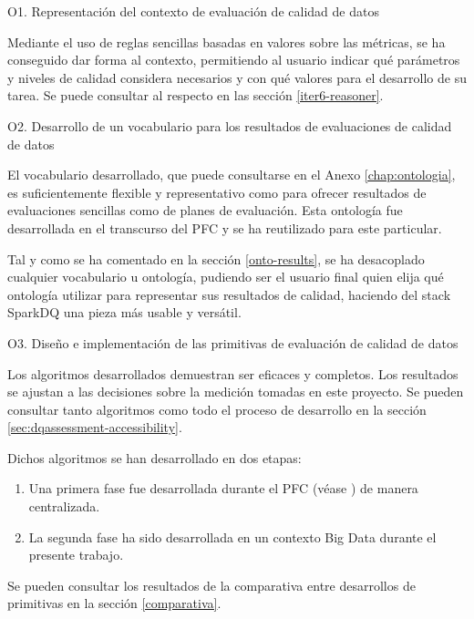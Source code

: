 \begin{definitionlist}
\item[O1. Representación del contexto de evaluación de calidad de datos]

Mediante el uso de reglas sencillas basadas en valores sobre las métricas,
se ha conseguido dar forma al contexto, permitiendo al
usuario indicar qué parámetros y niveles de calidad considera necesarios 
y con qué valores para el desarrollo de su tarea. Se
puede consultar al respecto en las sección \ref{iter6-reasoner}.


\item[O2. Desarrollo de un vocabulario para los resultados de evaluaciones de
  calidad de datos]

El vocabulario desarrollado, que puede consultarse en el Anexo
\ref{chap:ontologia}, es suficientemente flexible y representativo como para
ofrecer resultados de evaluaciones sencillas como de planes de evaluación. Esta
ontología fue desarrollada en el transcurso del \acs{PFC} y se ha reutilizado
para este particular. 

Tal y como se ha comentado en la sección \ref{onto-results}, se ha desacoplado
cualquier vocabulario u ontología, pudiendo ser el usuario final quien elija qué
ontología utilizar para representar sus resultados de calidad, haciendo del
stack SparkDQ una pieza más usable y versátil. 

\item[O3. Diseño e implementación de las primitivas de evaluación de calidad de
  datos]

Los algoritmos desarrollados demuestran ser eficaces y completos. Los resultados
se ajustan a las decisiones sobre la medición tomadas en este proyecto. Se
pueden consultar tanto algoritmos como todo el proceso de desarrollo en la
sección \ref{sec:dqassessment-accessibility}. 

Dichos algoritmos se han desarrollado en dos etapas:

\begin{enumerate}
\item Una primera fase fue desarrollada durante el \acs{PFC} (véase \cite{PFC})
  de manera centralizada. 
\item La segunda fase ha sido desarrollada en un contexto Big Data durante el
  presente trabajo.
\end{enumerate}

Se pueden consultar los resultados de la comparativa entre desarrollos de
primitivas en la sección \ref{comparativa}. 



\end{definitionlist}

